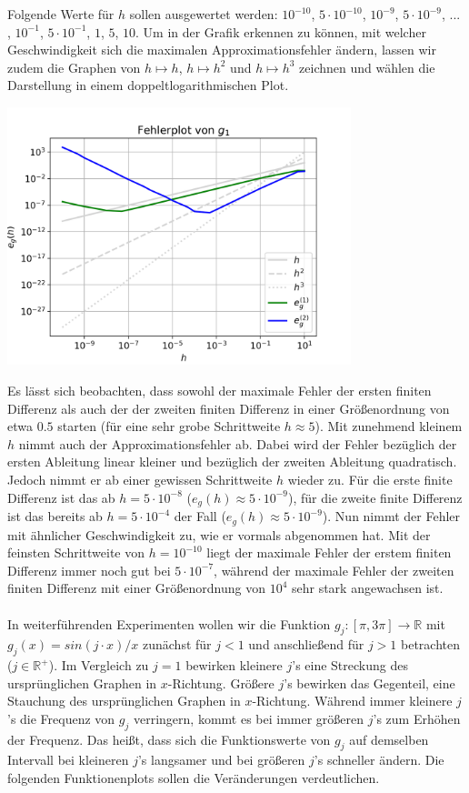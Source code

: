\documentclass{scrartcl}
\begin{document}
Folgende Werte für $h$ sollen ausgewertet werden: $10^{-10}$, $5 \cdot 10^{-10}$, $10^{-9}$, $5 \cdot 10^{-9}$, ... , $10^{-1}$, $5 \cdot 10^{-1}$, $1$, $5$, $10$.
Um in der Grafik erkennen zu können, mit welcher Geschwindigkeit sich die maximalen Approximationsfehler ändern, lassen wir zudem die Graphen von $h \mapsto h$, $h \mapsto h^{2}$ und $h \mapsto h^{3}$ zeichnen und wählen die Darstellung in einem doppeltlogarithmischen Plot.
\begin{center}
	\includegraphics[width=0.75\textwidth]{Grafiken/Fehlerplot_Aufgabe2}
\end{center}
Es lässt sich beobachten, dass sowohl der maximale Fehler der ersten finiten Differenz als auch der der zweiten finiten Differenz in einer Größenordnung von etwa $0.5$ starten (für eine sehr grobe Schrittweite $h \approx 5$). Mit zunehmend kleinem $h$ nimmt auch der Approximationsfehler ab. Dabei wird der Fehler bezüglich der ersten Ableitung linear kleiner und bezüglich der zweiten Ableitung quadratisch. Jedoch nimmt er ab einer gewissen Schrittweite $h$ wieder zu. Für die erste finite Differenz ist das ab $h = 5\cdot10^{-8}$ ($e_g(h) \approx  5 \cdot 10^{-9}$), für die zweite finite Differenz ist das bereits ab $h = 5 \cdot 10^{-4}$ der Fall ($e_g(h) \approx  5 \cdot 10^{-9}$). Nun nimmt der Fehler mit ähnlicher Geschwindigkeit zu, wie er vormals abgenommen hat. Mit der feinsten Schrittweite von $h = 10^{-10}$ liegt der maximale Fehler der erstem finiten Differenz immer noch gut bei $5 \cdot 10^{-7}$, während der maximale Fehler der zweiten finiten Differenz mit einer Größenordnung von $10^{4}$ sehr stark angewachsen ist.
\\
 \\
In weiterführenden Experimenten wollen wir die Funktion $g_j:[\pi, 3\pi] \rightarrow \mathbb{R}$ mit $g_j(x) = sin(j\cdot x)/x$ zunächst für $j<1$ und anschließend für $j>1$ betrachten ($j \in \mathbb{R^{+}}$). Im Vergleich zu $j = 1$ bewirken kleinere $j$'s eine Streckung des ursprünglichen Graphen in $x$-Richtung. Größere $j$'s bewirken das Gegenteil, eine Stauchung des ursprünglichen Graphen in $x$-Richtung. Während immer kleinere $j$'s die Frequenz von $g_j$ verringern, kommt es bei immer größeren $j$'s zum Erhöhen der Frequenz. Das heißt, dass sich die Funktionswerte von $g_j$ auf demselben Intervall bei kleineren $j$'s langsamer und bei größeren $j$'s schneller ändern. Die folgenden Funktionenplots sollen die Veränderungen verdeutlichen. \\
\end{document}
